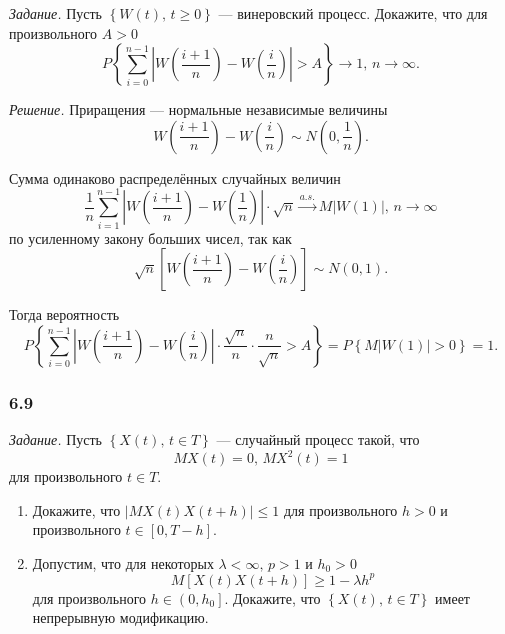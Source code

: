 \textit{Задание.}
Пусть $ \left\{ W \left( t \right), \, t \geq 0 \right\} $ --- винеровский процесс.
Докажите, что для произвольного $A > 0$
$$P \left\{
    \sum \limits_{i = 0}^{n - 1}
      \left| W \left( \frac{i + 1}{n} \right) - W \left( \frac{i}{n} \right) \right| > A
  \right\} \to
  1, \,
  n \to \infty.$$

\textit{Решение.}
Приращения --- нормальные независимые величины
$$W \left( \frac{i + 1}{n} \right) - W \left( \frac{i}{n} \right) \sim
  N \left( 0, \frac{1}{n} \right).$$

Сумма одинаково распределённых случайных величин
$$ \frac{1}{n} \sum \limits_{i = 1}^{n - 1}
    \left| W \left( \frac{i + 1}{n} \right) - W \left( \frac{1}{n} \right) \right| \cdot
  \sqrt{n} \overset{a.s.}{ \to }
  M \left| W \left( 1 \right) \right|, \,
  n \to \infty $$
по усиленному закону больших чисел, так как
$$ \sqrt{n} \left[ W \left( \frac{i + 1}{n} \right) - W \left( \frac{i}{n} \right) \right] \sim
  N \left( 0, 1 \right).$$

Тогда вероятность
$$P \left\{
    \sum \limits_{i = 0}^{n - 1}
      \left| W \left( \frac{i + 1}{n} \right) - W \left( \frac{i}{n} \right) \right| \cdot
    \frac{ \sqrt{n}}{n} \cdot \frac{n}{ \sqrt{n}} > A \right\} =
  P \left\{ M \left| W \left( 1 \right) \right| > 0 \right\} =
  1.$$

\subsubsection*{6.9}

\textit{Задание.}
Пусть $ \left\{ X \left( t \right), \, t \in T \right\} $ --- случайный процесс такой, что
$$MX \left( t \right) = 0, \,
  MX^2 \left( t \right) = 1$$
для произвольного $t \in T$.
\begin{enumerate}[label=\alph*)]
  \item Докажите, что $ \left| MX \left( t \right) X \left( t + h \right) \right| \leq 1$
  для произвольного $h > 0$ и произвольного $t \in \left[ 0, T - h \right] $.
  \item Допустим, что для некоторых $ \lambda < \infty, \, p > 1$ и $h_0 > 0$
  $$M \left[ X \left( t \right) X \left( t + h \right) \right] \geq
    1 - \lambda h^p$$
  для произвольного $h \in \left( 0, h_0 \right] $.
  Докажите, что $ \left\{ X \left( t \right), \, t \in T \right\} $ имеет непрерывную модификацию.
\end{enumerate}

